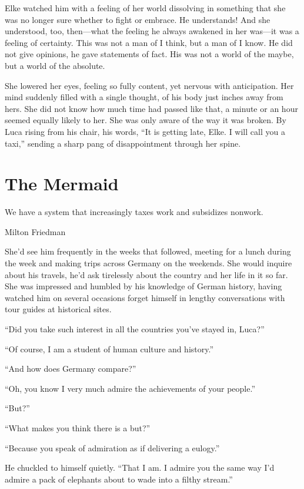 Elke watched him with a feeling of her world dissolving in something that she was no longer sure whether to fight or embrace. He understands! And she understood, too, then---what the feeling he always awakened in her was---it was a feeling of certainty. This was not a man of I think, but a man of I know. He did not give opinions, he gave statements of fact. His was not a world of the maybe, but a world of the absolute.

She lowered her eyes, feeling so fully content, yet nervous with anticipation. Her mind suddenly filled with a single thought, of his body just inches away from hers. She did not know how much time had passed like that, a minute or an hour seemed equally likely to her. She was only aware of the way it was broken. By Luca rising from his chair, his words, ``It is getting late, Elke. I will call you a taxi,'' sending a sharp pang of disappointment through her spine.

\chapter{The Mermaid}

\epigraph{We have a system that increasingly taxes work and subsidizes nonwork.}{Milton Friedman}

\firstparagraph

She'd see him frequently in the weeks that followed, meeting for a lunch during the week and making trips across Germany on the weekends. She would inquire about his travels, he'd ask tirelessly about the country and her life in it so far. She was impressed and humbled by his knowledge of German history, having watched him on several occasions forget himself in lengthy conversations with tour guides at historical sites.

``Did you take such interest in all the countries you've stayed in, Luca?''

``Of course, I am a student of human culture and history.''

``And how does Germany compare?''

``Oh, you know I very much admire the achievements of your people.''

``But?''

``What makes you think there is a but?''

``Because you speak of admiration as if delivering a eulogy.''

He chuckled to himself quietly. ``That I am. I admire you the same way I'd admire a pack of elephants about to wade into a filthy stream.''


